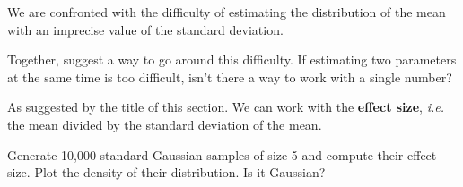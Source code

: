 \documentclass[a4paper]{article}
\theoremstyle{definition}
\begin{document}
We are confronted with the difficulty of estimating the distribution
of the mean with an imprecise value of the standard deviation.

\begin{Exercise}
Together, suggest a way to go around this difficulty. If estimating
two parameters at the same time is too difficult, isn't there a way to
work with a single number?
\end{Exercise}
\begin{Answer}
As suggested by the title of this section. We can work with the
\textbf{effect size}, \textit{i.e.} the mean divided by the standard
deviation of the mean.
\end{Answer}

\begin{Exercise}
Generate 10,000 standard Gaussian samples of size 5 and compute their
effect size. Plot the density of their distribution. Is it Gaussian?
\end{Exercise}
\end{document}
